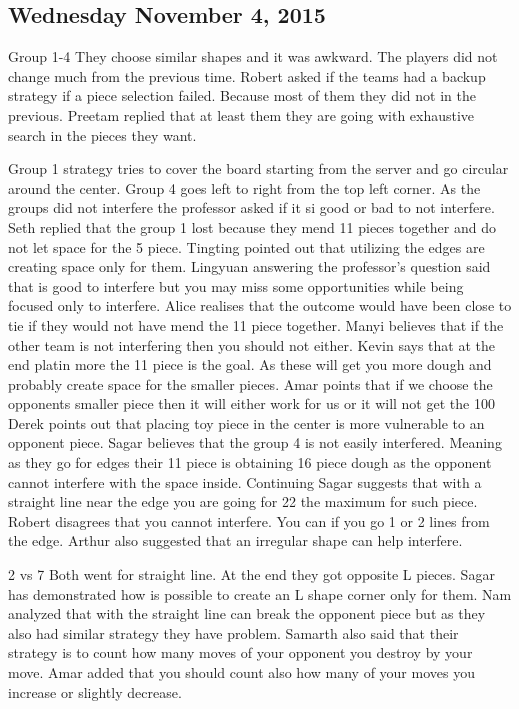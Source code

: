 \subsection{Wednesday November 4, 2015}
Group 1-4
They choose similar shapes and it was awkward.
The players did not change much from the previous time.
Robert asked if the teams had a backup strategy if a piece selection failed. Because most of them they did not in the previous.
Preetam replied that at least them they are going with exhaustive search in the pieces they want.

Group 1 strategy tries to cover the board starting from the server and go circular around the center.
Group 4 goes left to right from the top left corner.
As the groups did not interfere the professor asked if it si good or bad to not interfere.
Seth replied that the group 1 lost because they mend 11 pieces together and do not let space for the 5 piece.
Tingting pointed out that utilizing the edges are creating space only for them.
Lingyuan answering the professor’s question said that is good to interfere but you may miss some opportunities while being focused only to interfere. 
Alice realises that the outcome would have been close to tie if they would not have mend the 11 piece together.
Manyi believes that if the other team is not interfering then you should not either.
Kevin says that at the end platin more the 11 piece is the goal. As these will get you more dough and probably create space for the smaller pieces.
Amar points that if we choose the opponents smaller piece then it will either work for us or it will not get the 100%
Derek points out that placing toy piece in the center is more vulnerable to an opponent piece.
Sagar believes that the group 4 is not easily interfered.  Meaning as they go for edges their 11 piece is obtaining 16 piece dough as the opponent cannot interfere with the space inside.
Continuing Sagar suggests that with a straight line near the edge you are going for 22 the maximum for such piece.
Robert disagrees that you cannot interfere. You can if you go 1 or 2 lines from the edge.
Arthur also suggested that an irregular shape can help interfere. 


2 vs 7
Both went for straight line. At the end they got opposite L pieces.
Sagar has demonstrated how is possible to create an L shape corner only for them.
Nam analyzed that with the straight line can break the opponent piece but as they also had similar strategy they have problem.
Samarth also said that their strategy is to count how many moves of your opponent you destroy by your move.
Amar added that you should count also how many of your moves you increase or slightly decrease.



